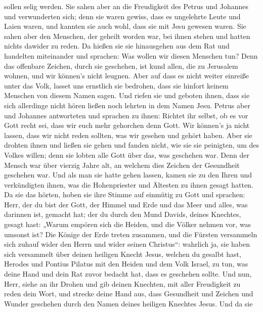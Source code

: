 sollen selig werden.  Sie sahen aber an die Freudigkeit des
Petrus und Johannes und verwunderten sich; denn sie waren gewiss, dass
es ungelehrte Leute und Laien waren, und kannten sie auch wohl, dass sie
mit Jesu gewesen waren.  Sie sahen aber den Menschen, der
geheilt worden war, bei ihnen stehen und hatten nichts dawider zu reden.
 Da hießen sie sie hinausgehen aus dem Rat und handelten
miteinander und sprachen:  Was wollen wir diesen Menschen
tun? Denn das offenbare Zeichen, durch sie geschehen, ist kund allen,
die zu Jerusalem wohnen, und wir können's nicht leugnen. 
Aber auf dass es nicht weiter einreiße unter das Volk, lasset uns
ernstlich sie bedrohen, dass sie hinfort keinem Menschen von diesem
Namen sagen.  Und riefen sie und geboten ihnen, dass sie
sich allerdinge nicht hören ließen noch lehrten in dem Namen Jesu.
 Petrus aber und Johannes antworteten und sprachen zu
ihnen: Richtet ihr selbst, ob es vor Gott recht sei, dass wir euch mehr
gehorchen denn Gott.  Wir können's ja nicht lassen, dass
wir nicht reden sollten, was wir gesehen und gehört haben. 
Aber sie drohten ihnen und ließen sie gehen und fanden nicht, wie sie
sie peinigten, um des Volkes willen; denn sie lobten alle Gott über das,
was geschehen war.  Denn der Mensch war über vierzig Jahre
alt, an welchem dies Zeichen der Gesundheit geschehen war. 
Und als man sie hatte gehen lassen, kamen sie zu den Ihren und
verkündigten ihnen, was die Hohenpriester und Ältesten zu ihnen gesagt
hatten.  Da sie das hörten, hoben sie ihre Stimme auf
einmütig zu Gott und sprachen: Herr, der du bist der Gott, der Himmel
und Erde und das Meer und alles, was darinnen ist, gemacht hat;
 der du durch den Mund Davids, deines Knechtes, gesagt
hast: „Warum empören sich die Heiden, und die Völker nehmen vor, was
umsonst ist?  Die Könige der Erde treten zusammen, und die
Fürsten versammeln sich zuhauf wider den Herrn und wider seinen
Christus``:  wahrlich ja, sie haben sich versammelt über
deinen heiligen Knecht Jesus, welchen du gesalbt hast, Herodes und
Pontius Pilatus mit den Heiden und dem Volk Israel,  zu
tun, was deine Hand und dein Rat zuvor bedacht hat, dass es geschehen
sollte.  Und nun, Herr, siehe an ihr Drohen und gib deinen
Knechten, mit aller Freudigkeit zu reden dein Wort,  und
strecke deine Hand aus, dass Gesundheit und Zeichen und Wunder geschehen
durch den Namen deines heiligen Knechtes Jesus.  Und da sie
